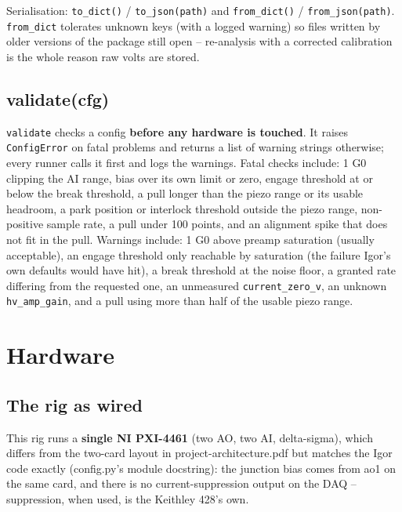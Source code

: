 Serialisation: \texttt{to\_\discretionary{}{}{}dict()} / \texttt{to\_\discretionary{}{}{}json(path)} and \texttt{from\_\discretionary{}{}{}dict()} / \texttt{from\_\discretionary{}{}{}json(path)}. \texttt{from\_\discretionary{}{}{}dict} tolerates unknown keys (with a logged warning) so files written by older versions of the package still open -- re-analysis with a corrected calibration is the whole reason raw volts are stored.

\section{validate(cfg)}

\texttt{validate} checks a config \textbf{before any hardware is touched}. It raises \texttt{Config\discretionary{}{}{}Error} on fatal problems and returns a list of warning strings otherwise; every runner calls it first and logs the warnings. Fatal checks include: 1 G0 clipping the AI range, bias over its own limit or zero, engage threshold at or below the break threshold, a pull longer than the piezo range or its usable headroom, a park position or interlock threshold outside the piezo range, non-positive sample rate, a pull under 100 points, and an alignment spike that does not fit in the pull. Warnings include: 1 G0 above preamp saturation (usually acceptable), an engage threshold only reachable by saturation (the failure Igor's own defaults would have hit), a break threshold at the noise floor, a granted rate differing from the requested one, an unmeasured \texttt{current\_\discretionary{}{}{}zero\_\discretionary{}{}{}v}, an unknown \texttt{hv\_\discretionary{}{}{}amp\_\discretionary{}{}{}gain}, and a pull using more than half of the usable piezo range.

\setcounter{chapter}{2}
\chapter{Hardware}

\section{The rig as wired}

This rig runs a \textbf{single NI PXI-4461} (two AO, two AI, delta-sigma), which differs from the two-card layout in project-architecture.pdf but matches the Igor code exactly (config.py's module docstring): the junction bias comes from ao1 on the same card, and there is no current-suppression output on the DAQ -- suppression, when used, is the Keithley 428's own.

